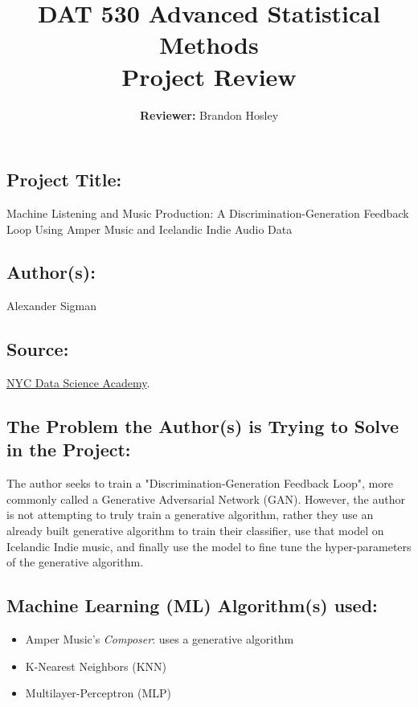 \documentclass[]{article}
\title{\textbf{DAT 530 Advanced Statistical Methods}\\
	\normalsize{Project Review} }
\author{\textbf{Reviewer: }
	Brandon Hosley}
\begin{document}
\setlength{\droptitle}{-10em} 
\pretitle{\begin{flushleft}\LARGE} %
	\posttitle{\end{flushleft}}
\preauthor{\begin{flushleft}\large} %
	\postauthor{\end{flushleft}}
\predate{\begin{flushleft}\large} %
	\postdate{\end{flushleft}}
\maketitle

\vspace{-3em}

\subsection*{Project Title:}
Machine Listening and Music Production: A Discrimination-Generation Feedback Loop Using Amper Music and Icelandic Indie Audio Data

\subsection*{Author(s):}
Alexander Sigman

\subsection*{Source:}
\href{https://nycdatascience.com/blog/student-works/machine-listening-and-music-production-a-discrimination-generation-feedback-loop-using-amper-music-and-icelandic-indie-audio-data/}{NYC Data Science Academy}.

\subsection*{The Problem the Author(s) is Trying to Solve in the Project:}
The author seeks to train a "Discrimination-Generation Feedback Loop", more commonly called a Generative Adversarial Network (GAN). However, the author is not attempting to truly train a generative algorithm, rather they use an already built generative algorithm to train their classifier, use that model on Icelandic Indie music, and finally use the model to fine tune the hyper-parameters of the generative algorithm.

\subsection*{Machine Learning (ML) Algorithm(s) used:}
\begin{itemize}
	\item Amper Music's \emph{Composer}: uses a generative algorithm
	\item K-Nearest Neighbors (KNN)
	\item Multilayer-Perceptron (MLP)
\end{itemize}
\end{document}

